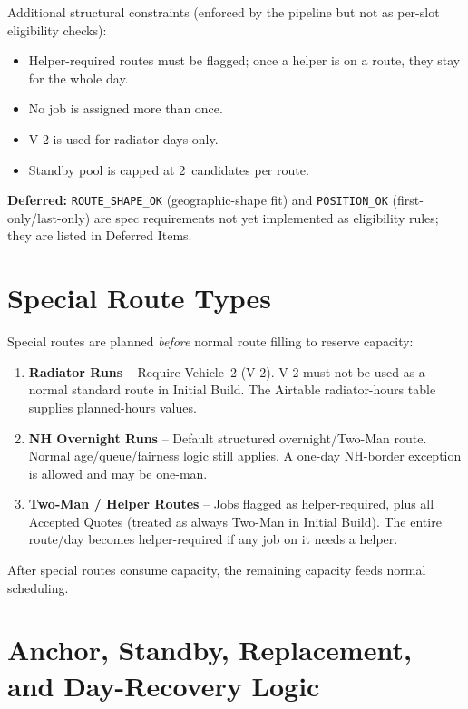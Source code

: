 \documentclass[12pt]{article}
\begin{document}
\noindent Additional structural constraints (enforced by the pipeline but not as per-slot eligibility checks):
\begin{itemize}
    \item Helper-required routes must be flagged; once a helper is on a route, they stay for the whole day.
    \item No job is assigned more than once.
    \item V-2 is used for radiator days only.
    \item Standby pool is capped at 2~candidates per route.
\end{itemize}

\noindent \textbf{Deferred:} \texttt{ROUTE\_SHAPE\_OK} (geographic-shape fit) and \texttt{POSITION\_OK} (first-only/last-only) are spec requirements not yet implemented as eligibility rules; they are listed in Deferred Items.

\section*{Special Route Types}

Special routes are planned \emph{before} normal route filling to reserve capacity:

\begin{enumerate}
    \item \textbf{Radiator Runs} -- Require Vehicle~2 (V-2).  V-2 must not be used as a normal standard route in Initial Build.  The Airtable radiator-hours table supplies planned-hours values.
    \item \textbf{NH Overnight Runs} -- Default structured overnight/Two-Man route.  Normal age/queue/fairness logic still applies.  A one-day NH-border exception is allowed and may be one-man.
    \item \textbf{Two-Man / Helper Routes} -- Jobs flagged as helper-required, plus all Accepted Quotes (treated as always Two-Man in Initial Build).  The entire route/day becomes helper-required if any job on it needs a helper.
\end{enumerate}

After special routes consume capacity, the remaining capacity feeds normal scheduling.

\section*{Anchor, Standby, Replacement, and Day-Recovery Logic}
\label{sec:standby}
\end{document}
